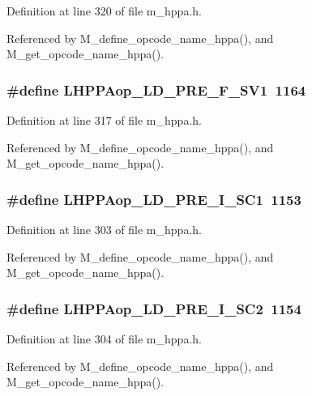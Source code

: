 Definition at line 320 of file m\_\-hppa.h.

Referenced by M\_\-define\_\-opcode\_\-name\_\-hppa(), and M\_\-get\_\-opcode\_\-name\_\-hppa().
\subsubsection{\setlength{\rightskip}{0pt plus 5cm}\#define LHPPAop\_\-LD\_\-PRE\_\-F\_\-SV1~1164}\label{m__hppa_8h_e7fee13fabe7861214d52102bd5ea147}




Definition at line 317 of file m\_\-hppa.h.

Referenced by M\_\-define\_\-opcode\_\-name\_\-hppa(), and M\_\-get\_\-opcode\_\-name\_\-hppa().
\subsubsection{\setlength{\rightskip}{0pt plus 5cm}\#define LHPPAop\_\-LD\_\-PRE\_\-I\_\-SC1~1153}\label{m__hppa_8h_947a71df486528ff38ab9a2102fb25e0}




Definition at line 303 of file m\_\-hppa.h.

Referenced by M\_\-define\_\-opcode\_\-name\_\-hppa(), and M\_\-get\_\-opcode\_\-name\_\-hppa().
\subsubsection{\setlength{\rightskip}{0pt plus 5cm}\#define LHPPAop\_\-LD\_\-PRE\_\-I\_\-SC2~1154}\label{m__hppa_8h_096cad4918bd377a2cb8460c44cbac76}




Definition at line 304 of file m\_\-hppa.h.

Referenced by M\_\-define\_\-opcode\_\-name\_\-hppa(), and M\_\-get\_\-opcode\_\-name\_\-hppa().
